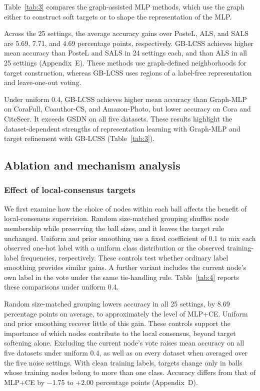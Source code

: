 \documentclass[times,review,10pt]{elsarticle}
\theoremstyle{definition}
\theoremstyle{plain}
\begin{document}
Table~\ref{tab:3} compares the graph-assisted MLP methods, which use the graph either to construct soft targets or to shape the representation of the MLP.



Across the 25 settings, the average accuracy gains over PosteL, ALS, and SALS are 5.69, 7.71, and 4.69 percentage points, respectively. GB-LCSS achieves higher mean accuracy than PosteL and SALS in 24 settings each, and than ALS in all 25 settings (Appendix~E). These methods use graph-defined neighborhoods for target construction, whereas GB-LCSS uses regions of a label-free representation and leave-one-out voting.

Under uniform 0.4, GB-LCSS achieves higher mean accuracy than Graph-MLP on CoraFull, Coauthor-CS, and Amazon-Photo, but lower accuracy on Cora and CiteSeer. It exceeds GSDN on all five datasets. These results highlight the dataset-dependent strengths of representation learning with Graph-MLP and target refinement with GB-LCSS (Table~\ref{tab:3}).

\subsection{Ablation and mechanism analysis}\label{sec:4.3}

\subsubsection{Effect of local-consensus targets}\label{sec:4.3.1}

We first examine how the choice of nodes within each ball affects the benefit of local-consensus supervision. Random size-matched grouping shuffles node membership while preserving the ball sizes, and it leaves the target rule unchanged. Uniform and prior smoothing use a fixed coefficient of 0.1 to mix each observed one-hot label with a uniform class distribution or the observed training-label frequencies, respectively. These controls test whether ordinary label smoothing provides similar gains. A further variant includes the current node's own label in the vote under the same tie-handling rule. Table~\ref{tab:4} reports these comparisons under uniform 0.4.



Random size-matched grouping lowers accuracy in all 25 settings, by 8.69 percentage points on average, to approximately the level of MLP+CE. Uniform and prior smoothing recover little of this gain. These controls support the importance of which nodes contribute to the local consensus, beyond target softening alone. Excluding the current node's vote raises mean accuracy on all five datasets under uniform 0.4, as well as on every dataset when averaged over the five noise settings. With clean training labels, targets change only in balls whose training nodes belong to more than one class. Accuracy differs from that of MLP+CE by \ensuremath{-}1.75 to +2.00 percentage points (Appendix~D).
\end{document}
